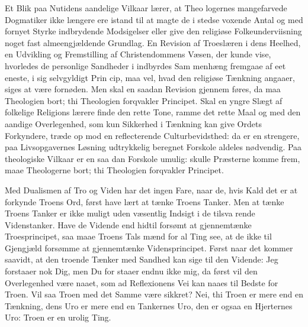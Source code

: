 \documentclass[12pt]{book}
\newcommand{\opage}[1]{\marginnote{\footnotesize\textit{[#1]}}}
\begin{document}
Et Blik paa Nutidens aandelige Vilkaar lærer, at Theo\-%
logernes mangefarvede Dogmatiker ikke længere ere istand
til at magte de i stedse voxende Antal og med fornyet
Styrke indbrydende Modsigelser eller give den religiøse
Folkeunderviisning noget fast almeengjældende Grundlag.
En Revision af Troeslæren i dens Heelhed, en Udvikling
og Fremstilling af Christendommens Væsen, der kunde
vise, hvorledes de personlige Sandheder i indbyrdes Sam\-%
menhæng fremgaae af eet eneste, i sig selvgyldigt Prin\-%
cip, maa vel, hvad den religiøse Tænkning angaaer, siges
at være fornøden. Men skal en saadan Revision gjennem\-%
føres, da maa Theologien bort; thi Theologien forqvakler
Principet. Skal en yngre Slægt af folkelige Religions\-%
lærere finde den rette Tone, ramme det rette Maal og
med den aandige Overlegenhed, som kun Sikkerhed i
Tænkning kan give Ordets Forkyndere, træde op mod
\opage{276}\setcounter{footnote}{0}%
en reflecterende Culturbevidsthed: da er en strengere, paa
Livsopgavernes Løsning udtrykkelig beregnet Forskole
aldeles nødvendig. Paa theologiske Vilkaar er en saa\-%
dan Forskole umulig: skulle Præsterne komme frem, maae
Theologerne bort; thi Theologien forqvakler Principet.

Med Dualismen af Tro og Viden har det ingen Fare,
naar de, hvis Kald det er at forkynde Troens Ord, først
have lært at tænke Troens Tanker. Men at tænke Troens
Tanker er ikke muligt uden væsentlig Indsigt i de tilsva\-%
rende Videnstanker. Have de Vidende end hidtil forsømt
at gjennemtænke Troesprincipet, saa maae Troens Tals\-%
mænd for al Ting see, at de ikke til Gjengjæld forsømme
at gjennemtænke Vidensprincipet. Først naar det kommer
saavidt, at den troende Tænker med Sandhed kan sige
til den Vidende: Jeg forstaaer nok Dig, men Du for\-%
staaer endnu ikke mig, da først vil den Overlegenhed
være naaet, som ad Reflexionens Vei kan naaes til Bedste
for Troen. Vil saa Troen med det Samme være sikkret?
Nei, thi Troen er mere end en Tænkning, dens Uro er
mere end en Tankernes Uro, den er ogsaa en Hjerternes
Uro: Troen er en urolig Ting.
\end{document}
